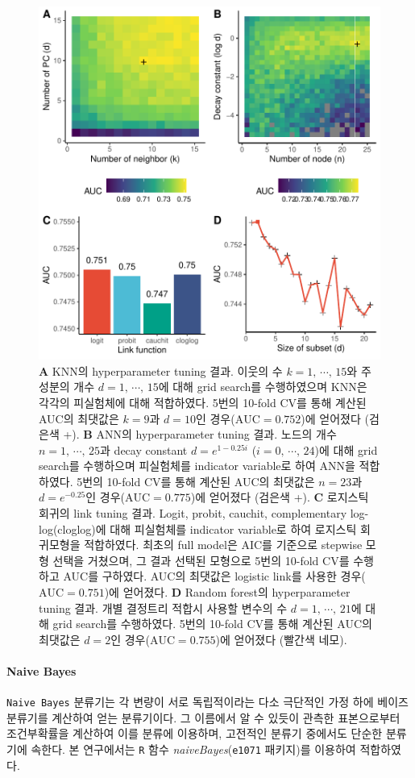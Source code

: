 \documentclass[11pt,onecolumn,twoside,a4size]{gsag3jnl}
\begin{document}
\begin{figure}[tp]
  \renewcommand{\familydefault}{\sfdefault}\normalfont
  \centering
  \includegraphics[width=0.7\linewidth]{tune.pdf}
  \caption{\small\textbf{A} KNN의 hyperparameter tuning 결과. 이웃의 수 $k=1,\,\cdots,\,15$와 주성분의 개수 $d=1,\,\cdots,\,15$에 대해 grid search를 수행하였으며 KNN은 각각의 피실험체에 대해 적합하였다. 5번의 10-fold CV를 통해 계산된 AUC의 최댓값은 $k=9$과 $d=10$인 경우($\mathrm{AUC}=0.752$)에 얻어졌다 (검은색 +). \textbf{B} ANN의 hyperparameter tuning 결과. 노드의 개수 $n=1,\,\cdots,\,25$과 decay constant $d=e^{1-0.25i}$ ($i=0,\,\cdots,\,24$)에 대해 grid search를 수행하으며 피실험체를 indicator variable로 하여 ANN을 적합하였다. 5번의 10-fold CV를 통해 계산된 AUC의 최댓값은 $n=23$과 $d=e^{-0.25}$인 경우($\mathrm{AUC}=0.775$)에 얻어졌다 (검은색 +). \textbf{C} 로지스틱 회귀의 link tuning 결과. Logit, probit, cauchit, complementary log-log(cloglog)에 대해 피실험체를 indicator variable로 하여 로지스틱 회귀모형을 적합하였다. 최초의 full model은 AIC를 기준으로 stepwise 모형 선택을 거쳤으며, 그 결과 선택된 모형으로 5번의 10-fold CV를 수행하고 AUC를 구하였다. AUC의 최댓값은 logistic link를 사용한 경우($\mathrm{AUC}=0.751$)에 얻어졌다. \textbf{D} Random forest의 hyperparameter tuning 결과. 개별 결정트리 적합시 사용할 변수의 수 $d=1,\,\cdots,\,21$에 대해 grid search를 수행하였다. 5번의 10-fold CV를 통해 계산된 AUC의 최댓값은 $d=2$인 경우($\mathrm{AUC}=0.755$)에 얻어졌다 (빨간색 네모).}
  \label{fig:tune}
\end{figure}

\paragraph{Naive Bayes} 
\texttt{Naive Bayes} 분류기는 각 변량이 서로 독립적이라는 다소 극단적인 가정 하에 베이즈 분류기를 계산하여 얻는 분류기이다. 그 이름에서 알 수 있듯이 관측한 표본으로부터 조건부확률을 계산하여 이를 분류에 이용하며, 고전적인 분류기 중에서도 단순한 분류기에 속한다. 본 연구에서는 \texttt{R} 함수 \textit{naiveBayes}(\texttt{e1071} 패키지)를 이용하여 적합하였다.
\end{document}
